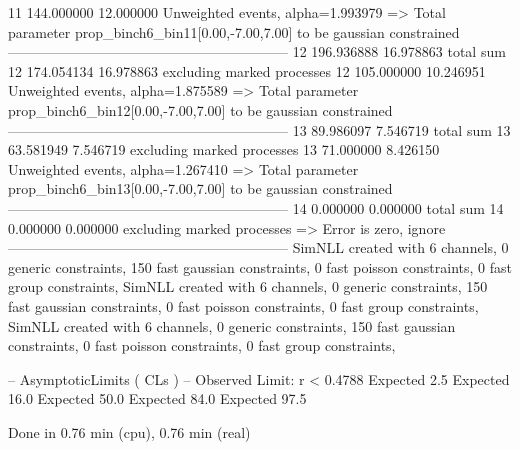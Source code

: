 11         144.000000      12.000000       Unweighted events, alpha=1.993979
  => Total parameter prop_binch6_bin11[0.00,-7.00,7.00] to be gaussian constrained
------------------------------------------------------------
12         196.936888      16.978863       total sum                     
12         174.054134      16.978863       excluding marked processes    
12         105.000000      10.246951       Unweighted events, alpha=1.875589
  => Total parameter prop_binch6_bin12[0.00,-7.00,7.00] to be gaussian constrained
------------------------------------------------------------
13         89.986097       7.546719        total sum                     
13         63.581949       7.546719        excluding marked processes    
13         71.000000       8.426150        Unweighted events, alpha=1.267410
  => Total parameter prop_binch6_bin13[0.00,-7.00,7.00] to be gaussian constrained
------------------------------------------------------------
14         0.000000        0.000000        total sum                     
14         0.000000        0.000000        excluding marked processes    
  => Error is zero, ignore      
------------------------------------------------------------
SimNLL created with 6 channels, 0 generic constraints, 150 fast gaussian constraints, 0 fast poisson constraints, 0 fast group constraints, 
SimNLL created with 6 channels, 0 generic constraints, 150 fast gaussian constraints, 0 fast poisson constraints, 0 fast group constraints, 
SimNLL created with 6 channels, 0 generic constraints, 150 fast gaussian constraints, 0 fast poisson constraints, 0 fast group constraints, 

 -- AsymptoticLimits ( CLs ) --
Observed Limit: r < 0.4788
Expected  2.5%
Expected 16.0%
Expected 50.0%
Expected 84.0%
Expected 97.5%

Done in 0.76 min (cpu), 0.76 min (real)
